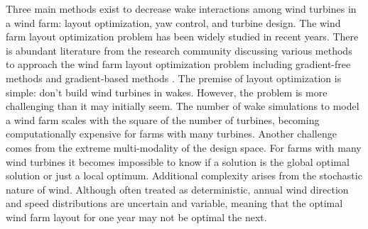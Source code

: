 Three main methods exist to decrease wake interactions among wind turbines in a wind farm: layout optimization, yaw control, and turbine design. The wind farm layout optimization problem has been widely studied in recent years. There is abundant literature from the research community discussing various methods to approach the wind farm layout optimization problem including gradient-free methods \citep{marmidis2008optimal,emami2010new,kusiak2010design,ituarte2011optimization,feng2015solving,gao2015wind} and gradient-based methods \citep{perez2013offshore,park2015layout,guirguis2016toward,Ning2016a}. The premise of layout optimization is simple: don't build wind turbines in wakes. %
However, the problem is more challenging than it may initially seem.
The number of wake simulations to model a wind farm scales with the square of the number of turbines, becoming computationally expensive for farms with many turbines. Another challenge comes from the extreme multi-modality of the design space. For farms with many wind turbines it becomes impossible to know if a solution is the global optimal solution or just a local optimum.  Additional complexity arises from the stochastic nature of wind. Although often treated as deterministic, annual wind direction and speed distributions are uncertain and variable, meaning that the optimal wind farm layout for one year may not be optimal the next.




